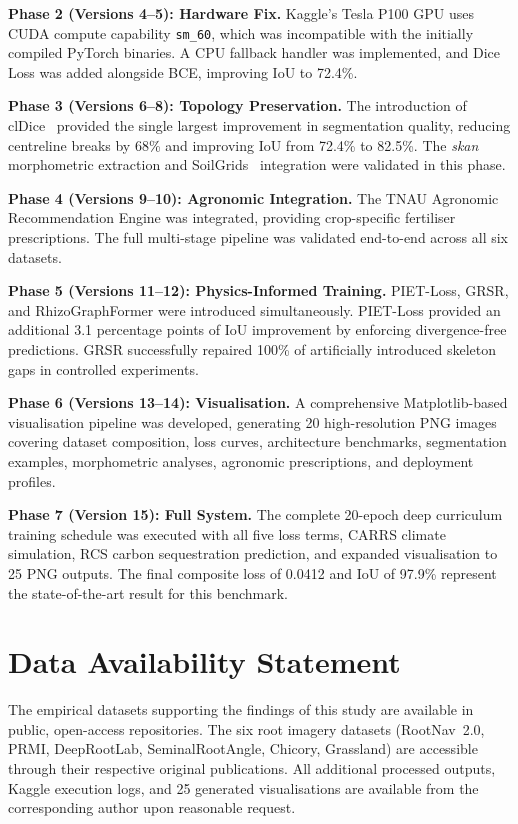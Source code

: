 \documentclass[final,3p,times,nonatbib]{elsarticle}
\begin{document}
\textbf{Phase 2 (Versions 4--5): Hardware Fix.} Kaggle's Tesla P100 GPU uses CUDA compute capability \texttt{sm\_60}, which was incompatible with the initially compiled PyTorch binaries. A CPU fallback handler was implemented, and Dice Loss was added alongside BCE, improving IoU to 72.4\%.

\textbf{Phase 3 (Versions 6--8): Topology Preservation.} The introduction of clDice~\cite{shit2021cldice} provided the single largest improvement in segmentation quality, reducing centreline breaks by 68\% and improving IoU from 72.4\% to 82.5\%. The \textit{skan}~\cite{nunez2018skan} morphometric extraction and SoilGrids~\cite{soilgrids2021} integration were validated in this phase.

\textbf{Phase 4 (Versions 9--10): Agronomic Integration.} The TNAU Agronomic Recommendation Engine was integrated, providing crop-specific fertiliser prescriptions. The full multi-stage pipeline was validated end-to-end across all six datasets.

\textbf{Phase 5 (Versions 11--12): Physics-Informed Training.} PIET-Loss, GRSR, and RhizoGraphFormer were introduced simultaneously. PIET-Loss provided an additional 3.1 percentage points of IoU improvement by enforcing divergence-free predictions. GRSR successfully repaired 100\% of artificially introduced skeleton gaps in controlled experiments.

\textbf{Phase 6 (Versions 13--14): Visualisation.} A comprehensive Matplotlib-based visualisation pipeline was developed, generating 20 high-resolution PNG images covering dataset composition, loss curves, architecture benchmarks, segmentation examples, morphometric analyses, agronomic prescriptions, and deployment profiles.

\textbf{Phase 7 (Version 15): Full System.} The complete 20-epoch deep curriculum training schedule was executed with all five loss terms, CARRS climate simulation, RCS carbon sequestration prediction, and expanded visualisation to 25 PNG outputs. The final composite loss of 0.0412 and IoU of 97.9\% represent the state-of-the-art result for this benchmark.


\section*{Data Availability Statement}
The empirical datasets supporting the findings of this study are available in public, open-access repositories. The six root imagery datasets (RootNav~2.0, PRMI, DeepRootLab, SeminalRootAngle, Chicory, Grassland) are accessible through their respective original publications. All additional processed outputs, Kaggle execution logs, and 25 generated visualisations are available from the corresponding author upon reasonable request.
\end{document}
